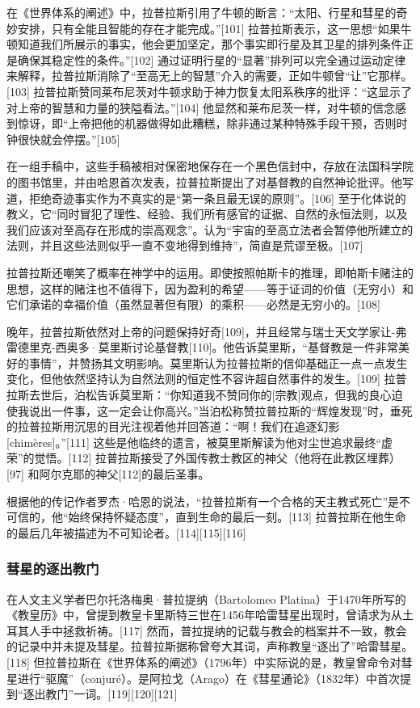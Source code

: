 在《世界体系的阐述》中，拉普拉斯引用了牛顿的断言：“太阳、行星和彗星的奇妙安排，只有全能且智能的存在才能完成。”[101] 拉普拉斯表示，这一思想“如果牛顿知道我们所展示的事实，他会更加坚定，那个事实即行星及其卫星的排列条件正是确保其稳定性的条件。”[102] 通过证明行星的“显著”排列可以完全通过运动定律来解释，拉普拉斯消除了“至高无上的智慧”介入的需要，正如牛顿曾“让”它那样。[103] 拉普拉斯赞同莱布尼茨对牛顿求助于神力恢复太阳系秩序的批评：“这显示了对上帝的智慧和力量的狭隘看法。”[104] 他显然和莱布尼茨一样，对牛顿的信念感到惊讶，即“上帝把他的机器做得如此糟糕，除非通过某种特殊手段干预，否则时钟很快就会停摆。”[105]

在一组手稿中，这些手稿被相对保密地保存在一个黑色信封中，存放在法国科学院的图书馆里，并由哈恩首次发表，拉普拉斯提出了对基督教的自然神论批评。他写道，拒绝奇迹事实作为不真实的是“第一条且最无误的原则”。[106] 至于化体说的教义，它“同时冒犯了理性、经验、我们所有感官的证据、自然的永恒法则，以及我们应该对至高存在形成的崇高观念”。认为“宇宙的至高立法者会暂停他所建立的法则，并且这些法则似乎一直不变地得到维持”，简直是荒谬至极。[107]

拉普拉斯还嘲笑了概率在神学中的运用。即使按照帕斯卡的推理，即帕斯卡赌注的思想，这样的赌注也不值得下，因为盈利的希望——等于证词的价值（无穷小）和它们承诺的幸福价值（虽然显著但有限）的乘积——必然是无穷小的。[108]

晚年，拉普拉斯依然对上帝的问题保持好奇[109]，并且经常与瑞士天文学家让-弗雷德里克-西奥多·莫里斯讨论基督教[110]。他告诉莫里斯，“基督教是一件非常美好的事情”，并赞扬其文明影响。莫里斯认为拉普拉斯的信仰基础正一点一点发生变化，但他依然坚持认为自然法则的恒定性不容许超自然事件的发生。[109] 拉普拉斯去世后，泊松告诉莫里斯：“你知道我不赞同你的[宗教]观点，但我的良心迫使我说出一件事，这一定会让你高兴。”当泊松称赞拉普拉斯的“辉煌发现”时，垂死的拉普拉斯用沉思的目光注视着他并回答道：“啊！我们在追逐幻影[chimères]。”[111] 这些是他临终的遗言，被莫里斯解读为他对尘世追求最终“虚荣”的觉悟。[112] 拉普拉斯接受了外国传教士教区的神父（他将在此教区埋葬）[97] 和阿尔克耶的神父[112]的最后圣事。

根据他的传记作者罗杰·哈恩的说法，“拉普拉斯有一个合格的天主教式死亡”是不可信的，他“始终保持怀疑态度”，直到生命的最后一刻。[113] 拉普拉斯在他生命的最后几年被描述为不可知论者。[114][115][116]
\subsubsection{彗星的逐出教门}  
在人文主义学者巴尔托洛梅奥·普拉提纳（Bartolomeo Platina）于1470年所写的《教皇历》中，曾提到教皇卡里斯特三世在1456年哈雷彗星出现时，曾请求为从土耳其人手中拯救祈祷。[117] 然而，普拉提纳的记载与教会的档案并不一致，教会的记录中并未提及彗星。拉普拉斯据称曾夸大其词，声称教皇“逐出了”哈雷彗星。[118] 但拉普拉斯在《世界体系的阐述》（1796年）中实际说的是，教皇曾命令对彗星进行“驱魔”（conjuré）。是阿拉戈（Arago）在《彗星通论》（1832年）中首次提到“逐出教门”一词。[119][120][121]